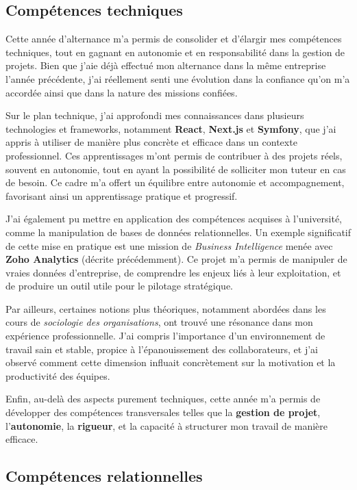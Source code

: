 \subsection{Compétences techniques}

Cette année d’alternance m’a permis de consolider et d’élargir mes compétences techniques, tout en gagnant en autonomie et en responsabilité dans la gestion de projets. Bien que j’aie déjà effectué mon alternance dans la même entreprise l’année précédente, j’ai réellement senti une évolution dans la confiance qu’on m’a accordée ainsi que dans la nature des missions confiées.

Sur le plan technique, j’ai approfondi mes connaissances dans plusieurs technologies et frameworks, notamment \textbf{React}, \textbf{Next.js} et \textbf{Symfony}, que j’ai appris à utiliser de manière plus concrète et efficace dans un contexte professionnel. Ces apprentissages m’ont permis de contribuer à des projets réels, souvent en autonomie, tout en ayant la possibilité de solliciter mon tuteur en cas de besoin. Ce cadre m’a offert un équilibre entre autonomie et accompagnement, favorisant ainsi un apprentissage pratique et progressif.

J’ai également pu mettre en application des compétences acquises à l’université, comme la manipulation de bases de données relationnelles. Un exemple significatif de cette mise en pratique est une mission de \textit{Business Intelligence} menée avec \textbf{Zoho Analytics} (décrite précédemment). Ce projet m’a permis de manipuler de vraies données d’entreprise, de comprendre les enjeux liés à leur exploitation, et de produire un outil utile pour le pilotage stratégique.

Par ailleurs, certaines notions plus théoriques, notamment abordées dans les cours de \textit{sociologie des organisations}, ont trouvé une résonance dans mon expérience professionnelle. J’ai compris l’importance d’un environnement de travail sain et stable, propice à l’épanouissement des collaborateurs, et j’ai observé comment cette dimension influait concrètement sur la motivation et la productivité des équipes.

Enfin, au-delà des aspects purement techniques, cette année m’a permis de développer des compétences transversales telles que la \textbf{gestion de projet}, l’\textbf{autonomie}, la \textbf{rigueur}, et la capacité à structurer mon travail de manière efficace.

\subsection{Compétences relationnelles}

